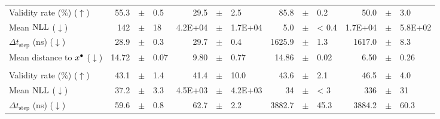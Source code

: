 \documentclass[../main.tex]{subfiles}
\begin{document}
\begin{adjustwidth}{-2.7in}{-3in}
\begin{center}
\begin{tabular}{lrllrllrllrll}
			\cmidrule(lr){2-13}
			Validity rate (\%) ($\uparrow$)                & 55.3                                       & $\pm$                                                             & 0.5                    & 29.5                    & $\pm$ & 2.5     & 85.8   & $\pm$ & 0.2   & 50.0    & $\pm$ & 3.0     \\
			Mean $\text{NLL}$ ($\downarrow$)                     & 142                                        & $\pm$                                                             & 18                     & 4.2E+04                 & $\pm$ & 1.7E+04 & 5.0    & $\pm$ & < 0.4 & 1.7E+04 & $\pm$ & 5.8E+02 \\
			$\Delta t_\text{step}$ (ns) ($\downarrow$)     & 28.9                                       & $\pm$                                                             & 0.3                    & 29.7                    & $\pm$ & 0.4     & 1625.9 & $\pm$ & 1.3   & 1617.0  & $\pm$ & 8.3     \\
			Mean distance to $x^\bullet$ ($\downarrow$) & 14.72                                      & $\pm$                                                             & 0.07                   & 9.80                    & $\pm$ & 0.77    & 14.86  & $\pm$ & 0.02  & 6.50    & $\pm$ & 0.26    \\
			\midrule
			                                               & \multicolumn{12}{c}{\OnlineNewsPopularity}                                                                                                                                                                                               \\
			\cmidrule(lr){2-13}
			Validity rate (\%) ($\uparrow$)                & 43.1                                       & $\pm$                                                             & 1.4                    & 41.4                    & $\pm$ & 10.0    & 43.6   & $\pm$ & 2.1   & 46.5    & $\pm$ & 4.0     \\
			Mean $\text{NLL}$ ($\downarrow$)                     & 37.2                                       & $\pm$                                                             & 3.3                    & 4.5E+03                 & $\pm$ & 4.2E+03 & 34     & $\pm$ & < 3   & 336     & $\pm$ & 31      \\
			$\Delta t_\text{step}$ (ns) ($\downarrow$)     & 59.6                                       & $\pm$                                                             & 0.8                    & 62.7                    & $\pm$ & 2.2     & 3882.7 & $\pm$ & 45.3  & 3884.2  & $\pm$ & 60.3    \\

\end{tabular}
\end{center}
\end{adjustwidth}
\end{document}

